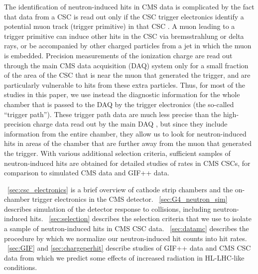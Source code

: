 The identification of neutron-induced hits in CMS data is complicated by the fact that data from a CSC is read out only if the CSC trigger electronics identify a potential muon track (trigger primitive) in that CSC \cite{Hauser:814259,Acosta:2002km,Acosta:200826}. A muon leading to a trigger primitive can induce other hits in the CSC via \eg bremsstrahlung or delta rays, or be accompanied by other charged particles from a jet in which the muon is embedded. Precision measurements of the ionization charge are read out through the main CMS data acquisition (DAQ) system only for a small fraction of the area of the CSC that is near the muon that generated the trigger, and are particularly vulnerable to hits from these extra particles. Thus, for most of the studies in this paper, we use instead the diagnostic information for the whole chamber that is passed to the DAQ by the trigger electronics (the so-called ``trigger path''). These trigger path data are much less precise than the high-precision charge data read out by the main DAQ \cite{Baarmand:1999ka}, but since they include information from the entire chamber, they allow us to look for neutron-induced hits in areas of the chamber that are further away from the muon that generated the trigger. With various additional selection criteria, sufficient samples of neutron-induced hits are obtained for detailed studies of rates in CMS CSCs, for comparison to simulated CMS data and GIF++ data.

\Sec~\ref{sec:csc_electronics} is a brief overview of cathode strip chambers and the on-chamber trigger electronics in the CMS detector. \Sec~\ref{sec:G4_neutron_sim} describes \GEANTfour simulation of the detector response to \pp collisions, including neutron-induced hits. \Sec~\ref{sec:selection} describes the selection criteria that we use to isolate a sample of neutron-induced hits in CMS CSC data. \Sec~\ref{sec:datamc} describes the procedure by which we normalize our neutron-induced hit counts into hit rates. \Secs~\ref{sec:GIF} and \ref{sec:chargeperhit} describe studies of GIF++ data and CMS CSC data from which we predict some effects of increased radiation in HL-LHC-like conditions. 

